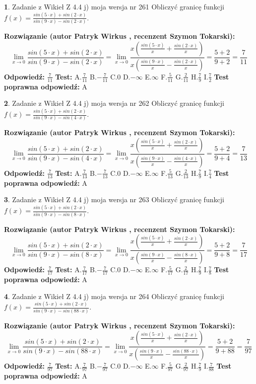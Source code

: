 \documentclass[12pt, a4paper]{article}
\theoremstyle{definition} %
\newtheorem{zad}{}
\newcommand{\zadStart}[1]{\begin{zad}#1\newline}
\newcommand{\zadStop}{\end{zad}}
\newcommand{\rozwStart}[2]{\noindent \textbf{Rozwiązanie (autor #1 , recenzent #2): }\newline}
\newcommand{\rozwStop}{\newline}
\newcommand{\odpStart}{\noindent \textbf{Odpowiedź:}\newline}
\newcommand{\odpStop}{\newline}
\newcommand{\testStart}{\noindent \textbf{Test:}\newline}
\newcommand{\testStop}{\newline}
\newcommand{\kluczStart}{\noindent \textbf{Test poprawna odpowiedź:}\newline}
\newcommand{\kluczStop}{\newline}
\begin{document}
\zadStart{Zadanie z Wikieł Z 4.4 j) moja wersja nr 261}
Obliczyć granicę funkcji $f(x)=\frac{sin(5\cdot x) +sin(2\cdot x)}{sin(9\cdot x) -sin(2\cdot x)}$.
\zadStop
\rozwStart{Patryk Wirkus}{Szymon Tokarski}
$$\lim\limits_{x\to 0}\frac{sin(5\cdot x) +sin(2\cdot x)}{sin(9\cdot x) -sin(2\cdot x)}=\lim\limits_{x\to 0}\frac{x(\frac{sin(5\cdot x)}{x}+\frac{sin(2\cdot x)}{x})}{x(\frac{sin(9\cdot x)}{x}-\frac{sin(2\cdot x)}{x})}=\frac{5+2}{9+2} = \frac{7}{11}$$
\rozwStop
\odpStart
$\frac{7}{11}$
\odpStop
\testStart
A.$\frac{7}{11}$
B.$-\frac{7}{11}$
C.$0$
D.$-\infty$
E.$\infty$
F.$\frac{5}{11}$
G.$\frac{2}{11}$
H.$\frac{7}{9}$
I.$\frac{7}{2}$
\testStop
\kluczStart
A
\kluczStop



\zadStart{Zadanie z Wikieł Z 4.4 j) moja wersja nr 262}
Obliczyć granicę funkcji $f(x)=\frac{sin(5\cdot x) +sin(2\cdot x)}{sin(9\cdot x) -sin(4\cdot x)}$.
\zadStop
\rozwStart{Patryk Wirkus}{Szymon Tokarski}
$$\lim\limits_{x\to 0}\frac{sin(5\cdot x) +sin(2\cdot x)}{sin(9\cdot x) -sin(4\cdot x)}=\lim\limits_{x\to 0}\frac{x(\frac{sin(5\cdot x)}{x}+\frac{sin(2\cdot x)}{x})}{x(\frac{sin(9\cdot x)}{x}-\frac{sin(4\cdot x)}{x})}=\frac{5+2}{9+4} = \frac{7}{13}$$
\rozwStop
\odpStart
$\frac{7}{13}$
\odpStop
\testStart
A.$\frac{7}{13}$
B.$-\frac{7}{13}$
C.$0$
D.$-\infty$
E.$\infty$
F.$\frac{5}{13}$
G.$\frac{2}{13}$
H.$\frac{7}{9}$
I.$\frac{7}{4}$
\testStop
\kluczStart
A
\kluczStop



\zadStart{Zadanie z Wikieł Z 4.4 j) moja wersja nr 263}
Obliczyć granicę funkcji $f(x)=\frac{sin(5\cdot x) +sin(2\cdot x)}{sin(9\cdot x) -sin(8\cdot x)}$.
\zadStop
\rozwStart{Patryk Wirkus}{Szymon Tokarski}
$$\lim\limits_{x\to 0}\frac{sin(5\cdot x) +sin(2\cdot x)}{sin(9\cdot x) -sin(8\cdot x)}=\lim\limits_{x\to 0}\frac{x(\frac{sin(5\cdot x)}{x}+\frac{sin(2\cdot x)}{x})}{x(\frac{sin(9\cdot x)}{x}-\frac{sin(8\cdot x)}{x})}=\frac{5+2}{9+8} = \frac{7}{17}$$
\rozwStop
\odpStart
$\frac{7}{17}$
\odpStop
\testStart
A.$\frac{7}{17}$
B.$-\frac{7}{17}$
C.$0$
D.$-\infty$
E.$\infty$
F.$\frac{5}{17}$
G.$\frac{2}{17}$
H.$\frac{7}{9}$
I.$\frac{7}{8}$
\testStop
\kluczStart
A
\kluczStop



\zadStart{Zadanie z Wikieł Z 4.4 j) moja wersja nr 264}
Obliczyć granicę funkcji $f(x)=\frac{sin(5\cdot x) +sin(2\cdot x)}{sin(9\cdot x) -sin(88\cdot x)}$.
\zadStop
\rozwStart{Patryk Wirkus}{Szymon Tokarski}
$$\lim\limits_{x\to 0}\frac{sin(5\cdot x) +sin(2\cdot x)}{sin(9\cdot x) -sin(88\cdot x)}=\lim\limits_{x\to 0}\frac{x(\frac{sin(5\cdot x)}{x}+\frac{sin(2\cdot x)}{x})}{x(\frac{sin(9\cdot x)}{x}-\frac{sin(88\cdot x)}{x})}=\frac{5+2}{9+88} = \frac{7}{97}$$
\rozwStop
\odpStart
$\frac{7}{97}$
\odpStop
\testStart
A.$\frac{7}{97}$
B.$-\frac{7}{97}$
C.$0$
D.$-\infty$
E.$\infty$
F.$\frac{5}{97}$
G.$\frac{2}{97}$
H.$\frac{7}{9}$
I.$\frac{7}{88}$
\testStop
\kluczStart
A
\kluczStop
\end{document}
